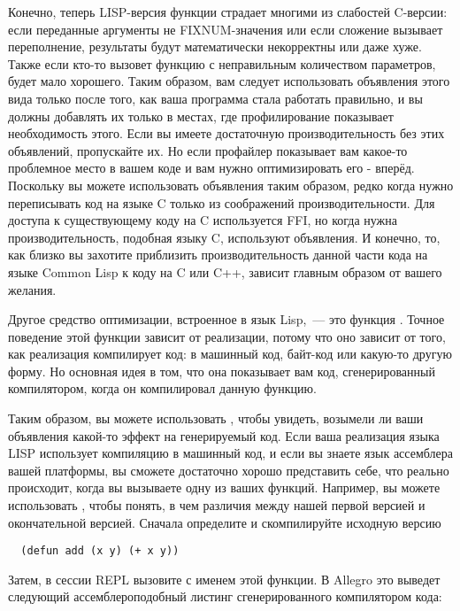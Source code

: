 Конечно, теперь LISP-версия функции страдает многими из слабостей C-версии: если
переданные аргументы не FIXNUM-значения или если сложение вызывает переполнение,
результаты будут математически некорректны или даже хуже. Также если кто-то вызовет
функцию  с неправильным количеством параметров, будет мало хорошего. Таким
образом, вам следует использовать объявления этого вида только после того, как ваша
программа стала работать правильно, и вы должны добавлять их только в местах, где
профилирование показывает необходимость этого. Если вы имеете достаточную
производительность без этих объявлений, пропускайте их. Но если профайлер показывает вам
какое-то проблемное место в вашем коде и вам нужно оптимизировать его - вперёд. Поскольку
вы можете использовать объявления таким образом, редко когда нужно переписывать код на
языке C только из соображений производительности. Для доступа к существующему коду на C
используется FFI, но когда нужна производительность, подобная языку C, используют
объявления. И конечно, то, как близко вы захотите приблизить производительность данной
части кода на языке Common Lisp к коду на C или C++, зависит главным образом от вашего
желания.

Другое средство оптимизации, встроенное в язык Lisp,~--- это функция
. Точное поведение этой функции зависит от реализации, потому что оно
зависит от того, как реализация компилирует код: в машинный код, байт-код или какую-то
другую форму. Но основная идея в том, что она показывает вам код, сгенерированный
компилятором, когда он компилировал данную функцию.

Таким образом, вы можете использовать , чтобы увидеть, возымели ли ваши
объявления какой-то эффект на генерируемый код. Если ваша реализация языка LISP использует
компиляцию в машинный код, и если вы знаете язык ассемблера вашей платформы, вы сможете
достаточно хорошо представить себе, что реально происходит, когда вы вызываете одну из
ваших функций. Например, вы можете использовать , чтобы понять, в чем
различия между нашей первой версией  и окончательной версией. Сначала определите
и скомпилируйте исходную версию

\begin{lstlisting}
  (defun add (x y) (+ x y))
\end{lstlisting}

Затем, в сессии REPL вызовите  с именем этой функции. В Allegro это
выведет следующий ассемблероподобный листинг сгенерированного компилятором кода:


